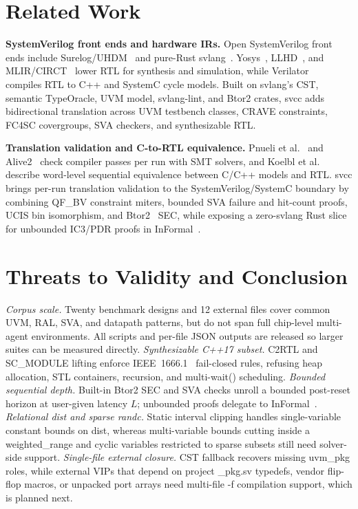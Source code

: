 \documentclass[conference]{IEEEtran}
\newcommand{\code}[1]{{\fontshape{n}\ttfamily #1}}
\begin{document}
\section{Related Work}
\label{sec:related}

\textbf{SystemVerilog front ends and hardware IRs.} Open SystemVerilog front ends include Surelog/UHDM~\cite{dargelas2024surelog} and pure-Rust \code{svlang}~\cite{kubavat2026svlang}. Yosys~\cite{wolf2013yosys}, LLHD~\cite{schuiki2020llhd}, and MLIR/CIRCT~\cite{lattner2021mlir,circt2024} lower RTL for synthesis and simulation, while Verilator~\cite{snyder2020verilator} compiles RTL to C++ and SystemC cycle models. Built on \code{svlang}'s CST, semantic \code{TypeOracle}, UVM model, \code{svlang-lint}, and Btor2 crates, \code{svcc} adds bidirectional translation across UVM testbench classes, CRAVE constraints, FC4SC covergroups, SVA checkers, and synthesizable RTL.

\textbf{Translation validation and C-to-RTL equivalence.} Pnueli et al.~\cite{pnueli1998tv} and Alive2~\cite{lopes2021alive2} check compiler passes per run with SMT solvers, and Koelbl et al.~\cite{koelbl2009c2rtl} describe word-level sequential equivalence between C/C++ models and RTL. \code{svcc} brings per-run translation validation to the SystemVerilog/SystemC boundary by combining \code{QF\_BV} constraint miters, bounded SVA failure and hit-count proofs, UCIS bin isomorphism, and Btor2~\cite{niemetz2018btor2} SEC, while exposing a zero-\code{svlang} Rust slice for unbounded IC3/PDR proofs in \code{InFormal}~\cite{kubavat2026informal}.

\section{Threats to Validity and Conclusion}
\label{sec:conclusion}

\emph{Corpus scale.} Twenty benchmark designs and 12 external files cover common UVM, RAL, SVA, and datapath patterns, but do not span full chip-level multi-agent environments. All scripts and per-file JSON outputs are released so larger suites can be measured directly. \emph{Synthesizable C++17 subset.} \code{C2RTL} and \code{SC\_MODULE} lifting enforce IEEE~1666.1~\cite{ieee1666_1_2016} fail-closed rules, refusing heap allocation, STL containers, recursion, and multi-\code{wait()} scheduling. \emph{Bounded sequential depth.} Built-in Btor2 SEC and SVA checks unroll a bounded post-reset horizon at user-given latency $L$; unbounded proofs delegate to \code{InFormal}~\cite{kubavat2026informal}. \emph{Relational \code{dist} and sparse \code{randc}.} Static interval clipping handles single-variable constant bounds on \code{dist}, whereas multi-variable bounds cutting inside a \code{weighted\_range} and cyclic variables restricted to sparse subsets still need solver-side support. \emph{Single-file external closure.} CST fallback recovers missing \code{uvm\_pkg} roles, while external VIPs that depend on project \code{*\_pkg.sv} typedefs, vendor flip-flop macros, or unpacked port arrays need multi-file \code{-f} compilation support, which is planned next.
\end{document}
